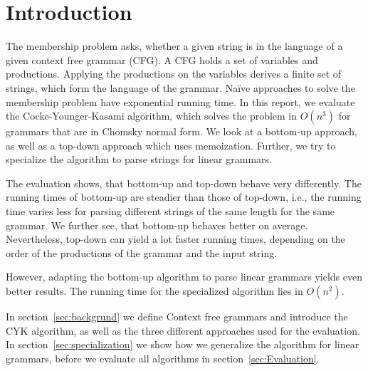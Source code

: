 \section*{Introduction}

The membership problem asks, whether a given string is in the language of a given context free grammar (CFG).
A CFG holds a set of variables and productions.
Applying the productions on the variables derives a finite set of strings, which form the language of the grammar.
Na\"{i}ve approaches to solve the membership problem have exponential running time.
In this report, we evaluate the Cocke-Younger-Kasami algorithm, which solves the problem in $O(n^3)$ for grammars that are in Chomsky normal form.
We look at a bottom-up approach, as well as a top-down approach which uses memoization.
Further, we try to specialize the algorithm to parse strings for linear grammars.

The evaluation shows, that bottom-up and top-down behave very differently.
The running times of bottom-up are steadier than those of top-down, i.e., the running time varies less for parsing different strings of the same length for the same grammar.
We further see, that bottom-up behaves better on average.
Nevertheless, top-down can yield a lot faster running times, depending on the order of the productions of the grammar and the input string.

However, adapting the bottom-up algorithm to parse linear grammars yields even better results.
The running time for the specialized algorithm lies in $O(n^2)$.

In section~\ref{sec:backgrund} we define Context free grammars and introduce the CYK algorithm, as well as the three different approaches used for the evaluation.
In section~\ref{sec:specialization} we show how we generalize the algorithm for linear grammars, before we evaluate all algorithms in section~\ref{sec:Evaluation}.



